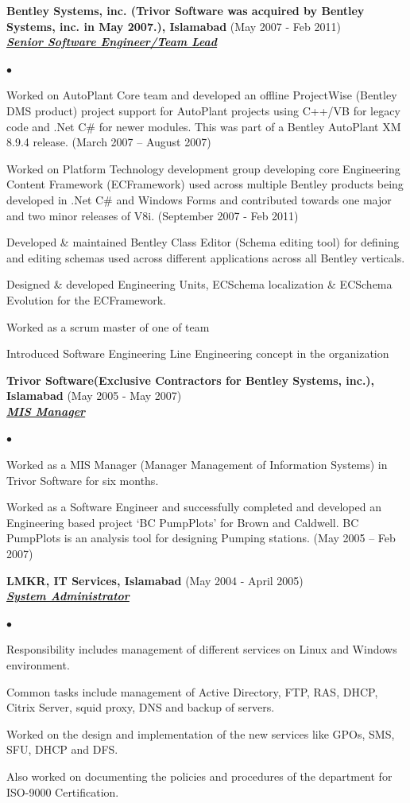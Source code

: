 \documentclass{article}
\newcommand{\employer}[3]{{ \textbf{#1} (#2)\\ \underline{\textbf{\emph{#3}}}\\  }}
\newenvironment{achievements}{\begin{list}{$\bullet$}{\topsep 0pt \itemsep -2pt}}{\vspace*{4pt}\end{list}}
\begin{document}
\employer{Bentley Systems, inc. (Trivor Software was acquired by Bentley Systems, inc. in May 2007.), Islamabad}{May 2007 - Feb 2011}{Senior Software Engineer/Team Lead}
	\begin{achievements}
	\item Worked on AutoPlant Core team and developed an offline ProjectWise (Bentley DMS product) project support for AutoPlant projects using C++/VB for legacy code and .Net C\# for newer modules. This was part of a Bentley AutoPlant XM 8.9.4 release. (March 2007 – August 2007)
	\item Worked on Platform Technology development group developing core Engineering Content Framework (ECFramework) used across multiple Bentley products being developed in .Net C\# and Windows Forms and contributed towards one major and two minor releases of V8i. (September 2007 - Feb 2011)
	\item Developed \& maintained Bentley Class Editor (Schema editing tool) for defining and editing schemas used across different applications across all Bentley verticals.
	\item Designed \& developed Engineering Units, ECSchema localization \& ECSchema Evolution for the ECFramework.
	\item Worked as a scrum master of one of team
	\item Introduced Software Engineering Line Engineering concept in the organization
	\end{achievements}

\employer{Trivor Software(Exclusive Contractors for Bentley Systems, inc.), Islamabad}{May 2005 - May 2007}{MIS Manager}
	\begin{achievements}
	\item Worked as a MIS Manager (Manager Management of Information Systems) in Trivor Software for six months.  
	\item Worked as a Software Engineer and successfully completed and developed an Engineering based project ‘BC PumpPlots’ for Brown and Caldwell. BC PumpPlots is an analysis tool for designing Pumping stations. (May 2005 – Feb 2007) 
	\end{achievements}

\employer{LMKR, IT Services, Islamabad}{May 2004 - April 2005}{System Administrator}
	\begin{achievements}
	\item Responsibility includes management of different services on Linux and Windows environment.
	\item Common tasks include management of Active Directory, FTP, RAS, DHCP, Citrix Server, squid proxy, DNS and backup of servers.
	\item Worked on the design and implementation of the new services like GPOs, SMS, SFU, DHCP and DFS. 
	\item Also worked on documenting the policies and procedures of the department for ISO-9000 Certification. 
	\end{achievements}
\end{document}

